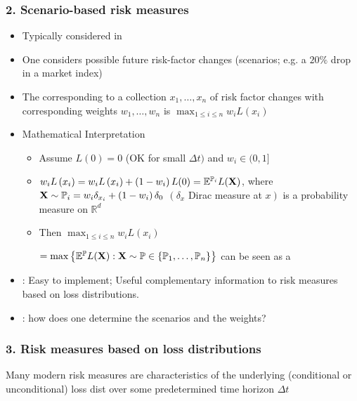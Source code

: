 \subsubsection*{2. Scenario-based risk measures}
\begin{itemize}[leftmargin=*]
    \item Typically considered in 
    \item One considers possible future risk-factor changes (scenarios; e.g. a $20 \%$ drop in a market index)
    \item The  corresponding to a collection $x_{1}, \ldots, x_{n}$ of risk factor changes with corresponding weights $w_{1}, \ldots, w_{n}$ is
$
\displaystyle \max _{1 \leq i \leq n} w_{i} L\left(x_{i}\right)
$
    \item Mathematical Interpretation
    \begin{itemize}[leftmargin=*]
        \item Assume $L(0)=0$ (OK for small $\Delta t)$ and $w_{i} \in(0,1]$
        \item $w_{i} L\left(x_{i}\right)=w_{i} L\left(x_{i}\right)+\left(1-w_{i}\right) L(0)=\mathbb{E}^{\mathbb{P}_{i}} L(\boldsymbol{\mathbf{X}})$, where $\boldsymbol{\mathbf{X}} \sim \mathbb{P}_{i}=w_{i} \delta_{x_{i}}+\left(1-w_{i}\right) \delta_{0}$ $\left(\delta_{x}\right.$ Dirac measure at $\left.x\right)$ is a probability measure on $\mathbb{R}^{d}$
        \item Then
$
\displaystyle \max _{1 \leq i \leq n} w_{i} L\left(x_{i}\right)
$

$=\max \left\{\mathbb{E}^{\mathbb{P}} L(\boldsymbol{\mathbf{X}}): \boldsymbol{\mathbf{X}} \sim \mathbb{P} \in\left\{\mathbb{P}_{1}, \ldots, \mathbb{P}_{n}\right\}\right\}$
can be seen as a  
    \end{itemize}
    \item {}: Easy to implement; Useful complementary information to risk measures based on loss distributions.
    \item {}:  how does one determine the scenarios and the weights?
\end{itemize}


\subsubsection*{3. Risk measures based on loss distributions}
Many modern risk measures are characteristics of the underlying (conditional or unconditional) loss dist over some predetermined time horizon $\Delta t$

